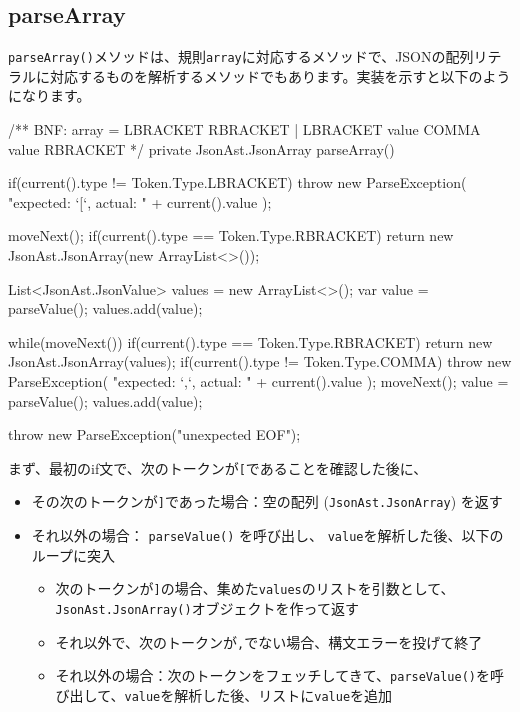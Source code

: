 \subsection{parseArray}

\texttt{parseArray()}メソッドは、規則\texttt{array}に対応するメソッドで、JSONの配列リテラルに対応するものを解析するメソッドでもあります。実装を示すと以下のようになります。

\begin{codescreen}{}
    /** BNF: array = LBRACKET RBRACKET | LBRACKET value {COMMA value} RBRACKET */
    private JsonAst.JsonArray parseArray() {
        if(current().type != Token.Type.LBRACKET) {
            throw new ParseException(
                "expected: `[`, actual: " + current().value
            );
        }

        moveNext();
        if(current().type == Token.Type.RBRACKET) {
            return new JsonAst.JsonArray(new ArrayList<>());
        }

        List<JsonAst.JsonValue> values = new ArrayList<>();
        var value = parseValue();
        values.add(value);

        while(moveNext()) {
            if(current().type == Token.Type.RBRACKET) {
                return new JsonAst.JsonArray(values);
            }
            if(current().type != Token.Type.COMMA) {
                throw new ParseException(
                    "expected: `,`, actual: " + current().value
                );
            }
            moveNext();
            value = parseValue();
            values.add(value);
        }

        throw new ParseException("unexpected EOF");
    }
\end{codescreen}

まず、最初のif文で、次のトークンが\texttt{{[}}であることを確認した後に、

\begin{itemize}
\item
  その次のトークンが\texttt{{]}}であった場合：空の配列
  (\texttt{JsonAst.JsonArray}) を返す
\item
  それ以外の場合： \texttt{parseValue()} を呼び出し、
  \texttt{value}を解析した後、以下のループに突入

  \begin{itemize}
  \item
    次のトークンが\texttt{{]}}の場合、集めた\texttt{values}のリストを引数として、\texttt{JsonAst.JsonArray()}オブジェクトを作って返す
  \item
    それ以外で、次のトークンが\texttt{,}でない場合、構文エラーを投げて終了
  \item
    それ以外の場合：次のトークンをフェッチしてきて、\texttt{parseValue()}を呼び出して、\texttt{value}を解析した後、リストに\texttt{value}を追加
  \end{itemize}
\end{itemize}

